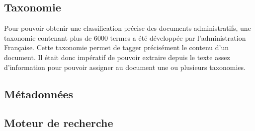 \subsection{Taxonomie}
Pour pouvoir obtenir une classification précise des documents administratifs, une taxonomie contenant plus de 6000 termes a été développée par l'administration Française. Cette taxonomie permet de tagger précisément le contenu d'un document.
Il était donc impératif de pouvoir extraire depuis le texte assez d'information pour pouvoir assigner au document une ou plusieurs taxonomies.

\subsection{Métadonnées}

\subsection{Moteur de recherche}
